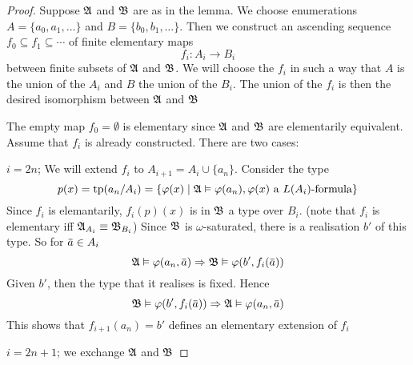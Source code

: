 \documentclass[11pt]{article}
\begin{document}
\begin{proof}
Suppose \(\mathfrak{A}\) and \(\mathfrak{B}\) are as in the lemma. We choose enumerations
\(A=\{a_0,a_1,\dots\}\) and \(B=\{b_0,b_1,\dots\}\). Then we construct an
ascending sequence \(f_0\subseteq f_1\subseteq \cdots\) of finite elementary
maps
\begin{equation*}
f_i:A_i\to B_i
\end{equation*}
between finite subsets of \(\mathfrak{A}\) and \(\mathfrak{B}\). We will choose the \(f_i\) in
such a way that \(A\) is the union of the \(A_i\) and \(B\) the union of the
\(B_i\). The union of the \(f_i\) is then the desired isomorphism between
\(\mathfrak{A}\) and \(\mathfrak{B}\)

The empty map \(f_0=\emptyset\) is elementary since \(\mathfrak{A}\) and \(\mathfrak{B}\) are
elementarily equivalent. Assume that \(f_i\) is already constructed. There
are two cases:

\(i=2n\); We will extend \(f_i\) to \(A_{i+1}=A_i\cup\{a_n\}\). Consider the
type
\begin{equation*}
p(x)=\operatorname{tp}(a_n/A_i)=\{\varphi(x)\mid\mathfrak{A}\vDash\varphi(a_n), \varphi(x)\text{ a $L(A_i)$-formula}\}
\end{equation*}
Since \(f_i\) is elemantarily, \(f_i(p)(x)\) is in \(\mathfrak{B}\) a type over
\(B_i\). (note that \(f_i\) is elementary iff \(\mathfrak{A}_{A_i}\equiv\mathfrak{B}_{B_i}\))
Since \(\mathfrak{B}\) is \(\omega\)-saturated, there is a realisation \(b'\)
of this type. So for \(\bbar{a}\in A_i\)
\begin{equation*}
\fA\vDash\varphi(a_n,\bbar{a}) \Rightarrow\fB\vDash\varphi(b',f_i(\bbar{a}))
\end{equation*}
Given \(b'\), then the type that it realises is fixed. Hence
\begin{equation*}
\fB\vDash\varphi(b',f_i(\bara))\Rightarrow\fA\vDash\varphi(a_n,\bara)
\end{equation*}
This shows that \(f_{i+1}(a_n)=b'\) defines an elementary extension of
\(f_i\)

\(i=2n+1\); we exchange \(\mathfrak{A}\) and \(\mathfrak{B}\)
\end{proof}
\end{document}
